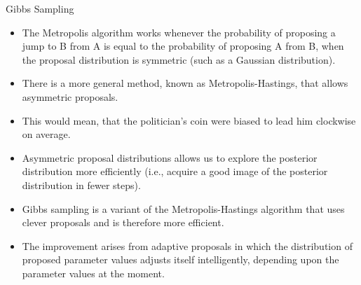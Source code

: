 \documentclass[handout]{beamer}
\begin{document}
\begin{frame}{Gibbs Sampling}
\scriptsize{

\begin{itemize}

\item The Metropolis algorithm works whenever the probability of proposing a jump to B from A is equal to the probability of proposing A from B, when the proposal distribution is symmetric (such as a Gaussian distribution). 

\item There is a more general method, known as Metropolis-Hastings, that allows asymmetric proposals.

\item This would mean, that the politician's coin were biased to lead him clockwise on average.

\item Asymmetric proposal distributions allows us to explore the posterior distribution more efficiently (i.e., acquire
a good image of the posterior distribution in fewer steps).

\item Gibbs sampling is a variant of the Metropolis-Hastings algorithm that uses clever proposals and is therefore more efficient.

\item The improvement arises from adaptive proposals in which the distribution of proposed parameter values adjusts itself intelligently, depending upon the parameter values at the moment.


\end{itemize}


} 
\end{frame}
\end{document}
